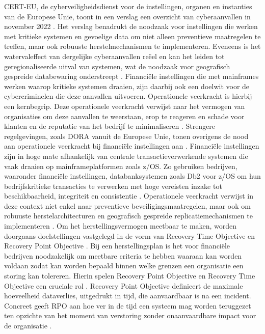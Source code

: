 CERT-EU, de cyberveiligheidsdienst voor de instellingen, organen en instanties van de Europese Unie, toont in een verslag een overzicht van cyberaanvallen in november 2022 \autocite{certeu_2022_cyber}.
Het verslag benadrukt de noodzaak voor instellingen die werken met kritieke systemen en gevoelige data om niet alleen preventieve maatregelen te treffen, maar ook robuuste herstelmechanismen te implementeren.
Eveneens is het watervaleffect van dergelijke cyberaanvallen reëel en kan het leiden tot geregionaliseerde uitval van systemen, wat de noodzaak voor geografisch gespreide databewaring onderstreept \autocite{emara2023geographically}.
Financiële instellingen die met mainframes werken waarop kritieke systemen draaien, zijn daarbij ook een doelwit voor de cybercriminelen die deze aanvallen uitvoeren.
Operationele veerkracht is hierbij een kernbegrip.
Deze operationele veerkracht verwijst naar het vermogen van organisaties om deze aanvallen te weerstaan, erop te reageren en schade voor klanten en de reputatie van het bedrijf te minimaliseren \autocite{essuman2020operational}.
Strengere regelgevingen, zoals DORA vanuit de Europese Unie, tonen overigens de nood aan operationele veerkracht bij financiële instellingen aan \autocite{clausmeier2023regulation}.
Financiële instellingen zijn in hoge mate afhankelijk van centrale transactieverwerkende systemen die vaak draaien op mainframeplatformen zoals z/OS\@.
Zo gebruiken bedrijven, waaronder financiële instellingen, databanksystemen zoals Db2 voor z/OS om hun bedrijfskritieke transacties te verwerken met hoge vereisten inzake tot beschikbaarheid, integriteit en consistentie \autocite{hernandez_2009_how}.
Operationele veerkracht verwijst in deze context niet enkel naar preventieve beveiligingsmaatregelen, maar ook om robuuste herstelarchitecturen en geografisch gespreide replicatiemechanismen te implementeren \autocite{bourbonnais2015}.
Om het herstellingsvermogen meetbaar te maken, worden doorgaans doelstellingen vastgelegd in de vorm van Recovery Time Objective en Recovery Point Objective \autocite{mendoncca2020evaluating}.
Bij een herstellingsplan is het voor financiële bedrijven noodzakelijk om meetbare criteria te hebben waaraan kan worden voldaan zodat kan worden bepaald binnen welke grenzen een organisatie een storing kan tolereren.
Hierin spelen Recovery Point Objective en Recovery Time Objective een cruciale rol \autocite{zgureanu2022role}.
Recovery Point Objective definieert de maximale hoeveelheid dataverlies, uitgedrukt in tijd, die aanvaardbaar is na een incident. 
Concreet geeft RPO aan hoe ver in de tijd een systeem mag worden teruggezet ten opzichte van het moment van verstoring zonder onaanvaardbare impact voor de organisatie \autocite{international2019security}. 
